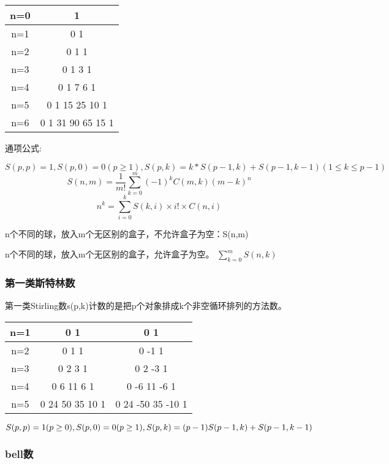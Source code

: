 \begin{tabular}{|c|c|}%
	\hline  %
	n=0 & 1\\
	\hline  %
	n=1 & 0 1\\
	\hline %
	n=2& 0 1 1\\
	\hline
	n=3& 0 1 3 1\\
	\hline
	n=4& 0 1 7 6 1\\
	\hline
	n=5& 0 1 15 25 10 1\\
	\hline
	n=6& 0 1 31 90 65 15 1\\
	\hline
\end{tabular}

通项公式:

$$
S(p,p) = 1, S(p, 0) = 0(p \ge 1), S(p, k) = k*S(p-1,k)+S(p-1,k-1)(1 \le k \le p-1) 
$$
$$
S(n,m) = \frac{1}{m!}\sum_{k=0}^{m}(-1)^kC(m, k)(m-k)^n 
$$
$$
n^k=\sum_ { i=0}^k S(k,i)×i!×C(n,i)
$$

n个不同的球，放入m个无区别的盒子，不允许盒子为空：S(n,m)

n个不同的球，放入m个无区别的盒子，允许盒子为空。 $\sum_{k=0}^{m}S(n,k)$

\subsubsection{第一类斯特林数}

第一类Stirling数s(p,k)计数的是把p个对象排成k个非空循环排列的方法数。

\begin{tabular}{|c|c|c|}%
	\hline  %
	n=1 & 0 1 & 0 1\\
	\hline %
	n=2 & 0 1 1 & 0 -1 1 \\
	\hline
	n=3 & 0 2 3 1 & 0 2 -3 1 \\
	\hline
	n=4 & 0 6 11 6 1 & 0 -6 11 -6 1 \\
	\hline
	n=5 & 0 24 50 35 10 1 & 0 24 -50 35 -10 1 \\
	\hline
\end{tabular}

$$
S(p,p) = 1 (p \ge 0), S(p, 0) = 0(p \ge 1), S(p,k)=(p-1)S(p-1, k)+S(p-1,k-1)\\
$$

\subsubsection{bell数}

